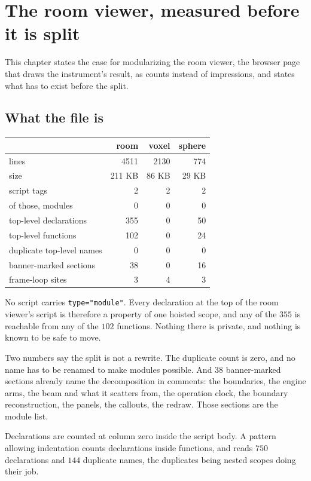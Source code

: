 \chapter{The room viewer, measured before it is split}

This chapter states the case for modularizing the room viewer, the browser page that draws the instrument's result, as counts instead of impressions, and states what has to exist before the split.

\section{What the file is}

\begin{center}
\begin{tabular}{@{}lrrr@{}}
\toprule
 & room & voxel & sphere \\
\midrule
lines & 4511 & 2130 & 774 \\
size & 211 KB & 86 KB & 29 KB \\
script tags & 2 & 2 & 2 \\
of those, modules & 0 & 0 & 0 \\
top-level declarations & 355 & 0 & 50 \\
top-level functions & 102 & 0 & 24 \\
duplicate top-level names & 0 & 0 & 0 \\
banner-marked sections & 38 & 0 & 16 \\
frame-loop sites & 3 & 4 & 3 \\
\bottomrule
\end{tabular}
\end{center}

No script carries \texttt{type="module"}. Every declaration at the top of the room viewer's script is therefore a property of one hoisted scope, and any of the \(355\) is reachable from any of the \(102\) functions. Nothing there is private, and nothing is known to be safe to move.

Two numbers say the split is not a rewrite. The duplicate count is zero, and no name has to be renamed to make modules possible. And \(38\) banner-marked sections already name the decomposition in comments: the boundaries, the engine arms, the beam and what it scatters from, the operation clock, the boundary reconstruction, the panels, the callouts, the redraw. Those sections are the module list.

Declarations are counted at column zero inside the script body. A pattern allowing indentation counts declarations inside functions, and reads \(750\) declarations and \(144\) duplicate names, the duplicates being nested scopes doing their job.

